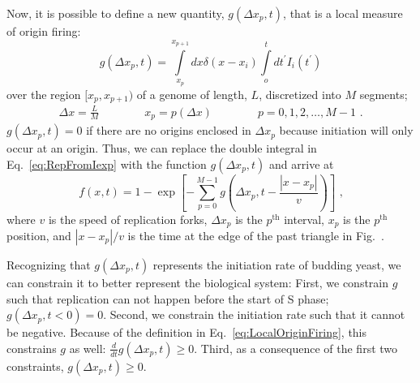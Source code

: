 		Now, it is possible to define a new quantity, $g(\Delta x_p,t)$, that is a local measure of origin firing:
		\begin{equation} \label{eq:LocalOriginFiring}
			g\left(\Delta x_p,t\right) = \int\limits_{x_p}^{x_{p+1}} dx \delta\left( x-x_i\right) \int\limits_o^t dt^\prime I_i\left( t^\prime\right)
		\end{equation}
		over the region $[x_p, x_{p+1})$ of a genome of length, $L$, discretized into $M$ segments;
		\begin{align}
			\Delta x = \frac{L}{M} \qquad\qquad x_p = p\left(\Delta x\right) \qquad\qquad p = 0, 1, 2, \ldots , M-1 \text{ .}
		\end{align}
		$g(\Delta x_p,t)=0$ if there are no origins enclosed in $\Delta x_p$ because initiation will only occur at an origin.
		Thus, we can replace the double integral in Eq.~\ref{eq:RepFromIexp} with the function $g(\Delta x_p,t)$ and arrive at
		\begin{equation} \label{eq:RepFromG}
			f\left( x,t\right) = 1 - \exp\left[ - \sum\limits_{p=0}^{M-1}g\left(\Delta x_p,t-\frac{\left| x-x_p \right|}{v}\right)\right] \text{ ,}
		\end{equation}
		where $v$ is the speed of replication forks, $\Delta x_p$ is the $p^\text{th}$ interval, $x_p$ is the $p^\text{th}$ position, and $\left| x-x_p \right|/v$ is the time at the edge of the past triangle in Fig.~\cite{fig:KJMA}.
		
		Recognizing that $g(\Delta x_p,t)$ represents the initiation rate of budding yeast, we can constrain it to better represent the biological system:
		First, we constrain $g$ such that replication can not happen before the start of S phase; $g(\Delta x_p,t<0)=0$.
		Second, we constrain the initiation rate such that it cannot be negative. Because of the definition in Eq.~\ref{eq:LocalOriginFiring}, this constrains $g$ as well: $\frac{d}{dt}g(\Delta x_p,t)\geq 0$.
		Third, as a consequence of the first two constraints, $g(\Delta x_p,t)\geq 0$.
		
